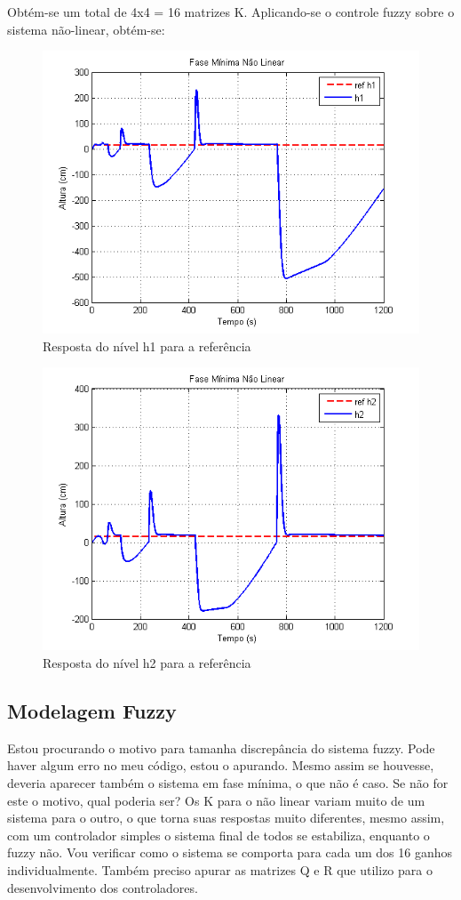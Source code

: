 \documentclass[11pt,]{article}
\begin{document}
	Obtém-se um total de 4x4 = 16 matrizes K. Aplicando-se o controle fuzzy sobre o sistema não-linear, obtém-se:
	\begin{figure}[H]
		\centering
		\includegraphics[scale=1]{h1_fuz_nm.png}
		\caption{Resposta do nível h1 para a referência}
		\label{h1_fuz_nm}
	\end{figure}
	\begin{figure}[H]
		\centering
		\includegraphics[scale=1]{h2_fuz_nm.png}
		\caption{Resposta do nível h2 para a referência}
		\label{h2_fuz_nm}
	\end{figure}
	
	\subsection{Modelagem Fuzzy}    
	Estou procurando o motivo para tamanha discrepância do sistema fuzzy. Pode haver algum erro no meu código, estou o apurando. Mesmo assim se houvesse, deveria aparecer também o sistema em fase mínima, o que não é caso.
	Se não for este o motivo, qual poderia ser? Os K para o não linear variam muito de um sistema para o outro, o que torna suas respostas muito diferentes, mesmo assim, com um controlador simples o sistema final de todos se estabiliza, enquanto o fuzzy não.
	Vou verificar como o sistema se comporta para cada um dos 16 ganhos individualmente. Também preciso apurar as matrizes Q e R que utilizo para o desenvolvimento dos controladores.

                            
\end{document}
